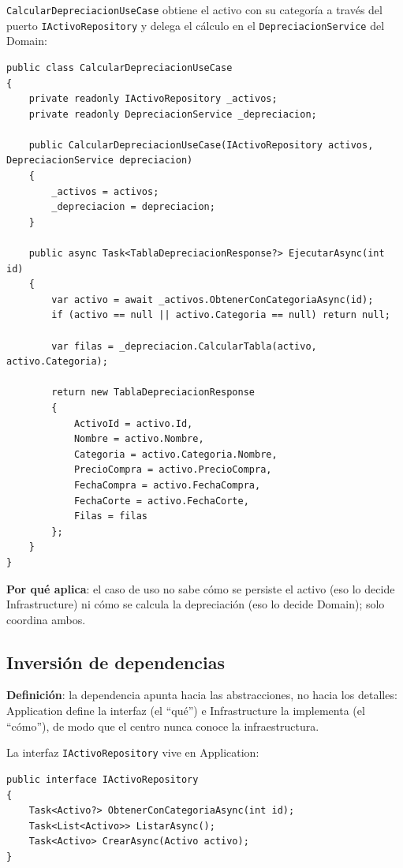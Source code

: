 \documentclass[11pt,a4paper]{article}
\begin{document}
\texttt{CalcularDepreciacionUseCase} obtiene el activo con su categoría a
través del puerto \texttt{IActivoRepository} y delega el cálculo en el
\texttt{DepreciacionService} del Domain:

\begin{lstlisting}[style=csharp, caption={AssetsService.Application/UseCases/CalcularDepreciacionUseCase.cs}]
public class CalcularDepreciacionUseCase
{
    private readonly IActivoRepository _activos;
    private readonly DepreciacionService _depreciacion;

    public CalcularDepreciacionUseCase(IActivoRepository activos, DepreciacionService depreciacion)
    {
        _activos = activos;
        _depreciacion = depreciacion;
    }

    public async Task<TablaDepreciacionResponse?> EjecutarAsync(int id)
    {
        var activo = await _activos.ObtenerConCategoriaAsync(id);
        if (activo == null || activo.Categoria == null) return null;

        var filas = _depreciacion.CalcularTabla(activo, activo.Categoria);

        return new TablaDepreciacionResponse
        {
            ActivoId = activo.Id,
            Nombre = activo.Nombre,
            Categoria = activo.Categoria.Nombre,
            PrecioCompra = activo.PrecioCompra,
            FechaCompra = activo.FechaCompra,
            FechaCorte = activo.FechaCorte,
            Filas = filas
        };
    }
}
\end{lstlisting}

\textbf{Por qué aplica}: el caso de uso no sabe cómo se persiste el activo
(eso lo decide Infrastructure) ni cómo se calcula la depreciación (eso lo
decide Domain); solo coordina ambos.

\subsection{Inversión de dependencias}

\textbf{Definición}: la dependencia apunta hacia las abstracciones, no hacia
los detalles: Application define la interfaz (el ``qué'') e Infrastructure la
implementa (el ``cómo''), de modo que el centro nunca conoce la
infraestructura.

La interfaz \texttt{IActivoRepository} vive en Application:

\begin{lstlisting}[style=csharp, caption={AssetsService.Application/Interfaces/IActivoRepository.cs}]
public interface IActivoRepository
{
    Task<Activo?> ObtenerConCategoriaAsync(int id);
    Task<List<Activo>> ListarAsync();
    Task<Activo> CrearAsync(Activo activo);
}
\end{lstlisting}
\end{document}
